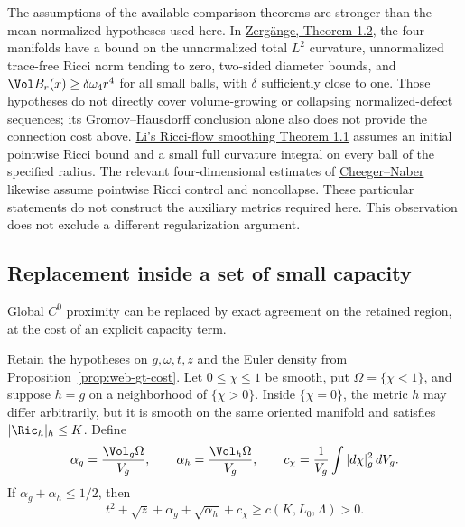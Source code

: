 The assumptions of the available comparison theorems are stronger than the
mean-normalized hypotheses used here.  In
\href{https://arxiv.org/pdf/1710.09324}{Zerg\"ange, Theorem 1.2}, the
four-manifolds have a bound on the unnormalized total \(L^2\) curvature,
unnormalized trace-free Ricci norm tending to zero, two-sided diameter
bounds, and
\(\Vol B_r(x)\ge\delta\omega_4r^4\) for all small balls, with
\(\delta\) sufficiently close to one.  Those hypotheses do not directly
cover volume-growing or collapsing normalized-defect sequences; its
Gromov--Hausdorff conclusion alone also does not provide the connection
cost above.  \href{https://arxiv.org/pdf/0911.3104}{Li's Ricci-flow smoothing
Theorem 1.1} assumes an initial pointwise Ricci bound and a small full
curvature integral on every ball of the specified radius.  The relevant
four-dimensional estimates of
\href{https://arxiv.org/pdf/1406.6534}{Cheeger--Naber} likewise assume
pointwise Ricci control and noncollapse.  These particular statements do
not construct the auxiliary metrics required here.  This observation does
not exclude a different regularization argument.

\subsection{Replacement inside a set of small capacity}

Global \(C^0\) proximity can be replaced by exact agreement on the
retained region, at the cost of an explicit capacity term.

\begin{proposition}
\label{prop:web-gt-capacity}
Retain the hypotheses on \(g,\omega,t,z\) and the Euler density from
Proposition~\ref{prop:web-gt-cost}.  Let \(0\le\chi\le1\) be smooth,
put \(\Omega=\{\chi<1\}\), and suppose \(h=g\) on a neighborhood
of \(\{\chi>0\}\).  Inside \(\{\chi=0\}\), the metric \(h\) may
differ arbitrarily, but it is smooth on the same oriented manifold and
satisfies \(|\Ric_h|_h\le K\).  Define
\[
 \alpha_g=\frac{\Vol_g\Omega}{V_g},\qquad
 \alpha_h=\frac{\Vol_h\Omega}{V_g},\qquad
 c_\chi=\frac1{V_g}\int|d\chi|_g^2\,dV_g.
\]
If \(\alpha_g+\alpha_h\le1/2\), then
\begin{equation}
 t^2+\sqrt z+\alpha_g+\sqrt{\alpha_h}+c_\chi
       \ge c(K,L_0,\Lambda)>0.
 \label{eq:web-gt-capacity-cost}
\end{equation}
\end{proposition}

